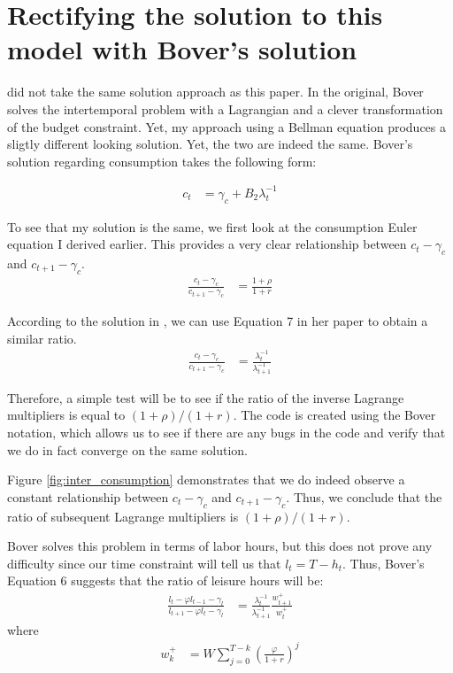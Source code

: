 \documentclass[\econtexRoot/ProjectMMD]{subfiles}
\begin{document}
\section{Rectifying the solution to this model with Bover's solution}

\cite{bover1991relaxing} did not take the same solution approach as this paper. In the original, Bover solves the intertemporal problem with a Lagrangian and a clever transformation of the budget constraint. Yet, my approach using a Bellman equation produces a sligtly different looking solution. Yet, the two are indeed the same. Bover's solution regarding consumption takes the following form:

\begin{align*}
  c_t &= \gamma_c + B_2 \lambda_t^{-1}
\end{align*}

To see that my solution is the same, we first look at the consumption Euler equation I derived earlier. This provides a very clear relationship between $c_t -\gamma_c$  and $c_{t+1} -\gamma_c$.
\begin{align*}
\frac{c_t - \gamma_c}{c_{t+1} - \gamma_c} &= \frac{1+\rho}{1+r}
\end{align*}

According to the solution in \cite{bover1991relaxing}, we can use Equation 7 in her paper to obtain a similar ratio.
\begin{align*}
  \frac{c_t - \gamma_c}{c_{t+1}-\gamma_c} &=  \frac{\lambda_t^{-1}}{\lambda_{t+1}^{-1}}
\end{align*}

Therefore, a simple test will be to see if the ratio of the inverse Lagrange multipliers is equal to $(1+\rho) / (1+r)$. The code is created using the Bover notation, which allows us to see if there are any bugs in the code and verify that we do in fact converge on the same solution.



Figure \ref{fig:inter_consumption} demonstrates that we do indeed observe a constant relationship between $c_t -\gamma_c$ and $c_{t+1} - \gamma_c$. Thus, we conclude that the ratio of subsequent Lagrange multipliers is $(1+\rho)/(1+r)$.


Bover solves this problem in terms of labor hours, but this does not prove any difficulty since our time constraint will tell us that $l_t = T-h_t$. Thus, Bover's Equation 6 suggests that the ratio of leisure hours will be:
\begin{align}
  \frac{ l_t - \varphi l_{t-1} - \gamma_l}{l_{t+1} - \varphi l_t - \gamma_l} &= \frac{\lambda_t^{-1}}{\lambda_{t+1}^{-1}} \frac{w_{t+1}^{+}}{w_t^{+}} \label{eq:bover_focl}
\end{align}
where
\begin{align*}
  w_k^{+} &=W \sum_{j=0}^{T-k}\left( \frac{\varphi}{1+r}\right) ^j
\end{align*}
\end{document}
